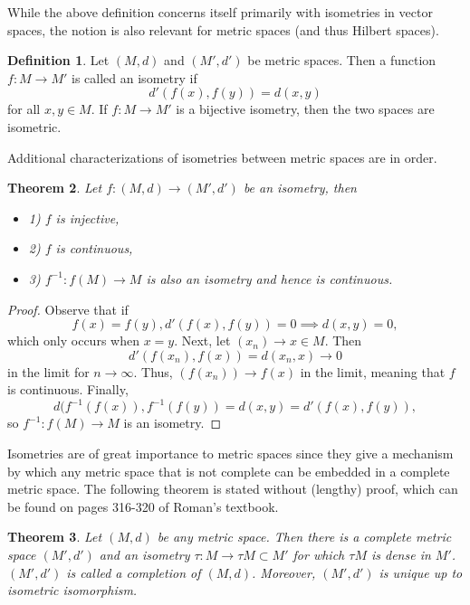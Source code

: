 \documentclass[psamsfonts]{amsart}
\newtheorem{thm}{Theorem}[section]
\theoremstyle{definition}
\newtheorem{defn}[thm]{Definition}
\theoremstyle{remark}
\numberwithin{equation}{section}
\begin{document}
While the above definition concerns itself primarily with isometries in vector spaces, the notion is also relevant for metric spaces (and thus Hilbert spaces). 

\begin{defn}
Let $(M,d)$ and $(M', d')$ be metric spaces. Then a function $f: M \rightarrow M'$ is called an isometry if 
$$d'(f(x), f(y)) = d(x,y) $$
for all $x,y \in M$. If $f:M \rightarrow M'$ is a bijective isometry, then the two spaces are isometric. 
\end{defn}

Additional characterizations of isometries between metric spaces are in order. 

\begin{thm}
Let $f: (M,d) \rightarrow (M', d')$ be an isometry, then 
\begin{itemize}
    \item 1) $f$ is injective, 
    \item 2) $f$ is continuous, 
    \item 3) $f^{-1} : f(M) \rightarrow M$ is also an isometry and hence is continuous. 
\end{itemize}
\end{thm}

\begin{proof}
Observe that if
$$f(x) = f(y), d'(f(x), f(y)) = 0 \implies d(x,y) = 0, $$
which only occurs when $x = y$. Next, let $(x_n) \rightarrow x \in M$. Then 
$$d'(f(x_n), f(x)) = d(x_n, x) \rightarrow 0 $$
in the limit for $n \rightarrow \infty.$ Thus, $(f(x_n)) \rightarrow f(x)$ in the limit, meaning that $f$ is continuous. Finally, 
$$d(f^{-1} (f(x)), f^{-1}(f(y)) = d(x,y) = d'(f(x), f(y)), $$
so $f^{-1} : f(M) \rightarrow M$ is an isometry. 
\end{proof}

Isometries are of great importance to metric spaces since they give a mechanism by which any metric space that is not complete can be embedded in a complete metric space. The following theorem is stated without (lengthy) proof, which can be found on pages 316-320 of Roman's textbook. 

\begin{thm}
Let $(M, d)$ be any metric space. Then there is a complete metric space $(M', d')$ and an isometry $\tau : M \rightarrow \tau M \subset M'$ for which $\tau M$ is dense in $M'$. $(M', d')$ is called a completion of $(M,d)$. Moreover, $(M',d')$ is unique up to isometric isomorphism. 
\end{thm}
\end{document}
